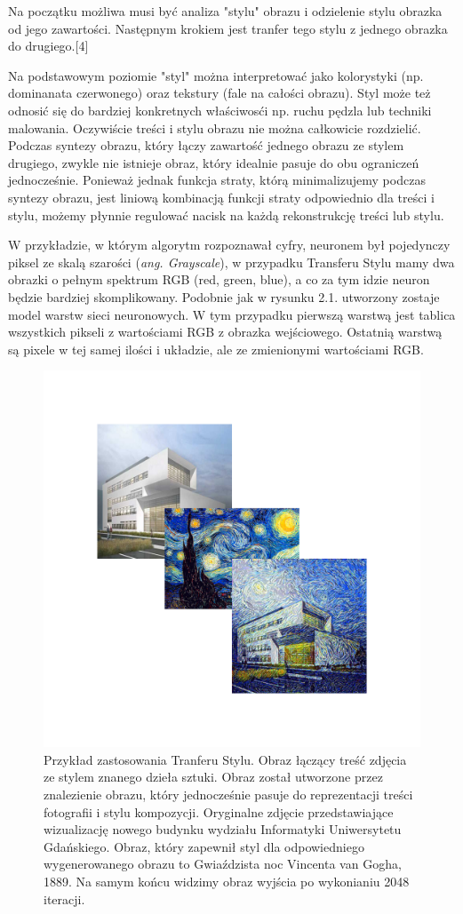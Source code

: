 \documentclass[brudnopis]{xmgr}
\begin{document}
Na początku możliwa musi być analiza "stylu" obrazu i odzielenie stylu obrazka od jego zawartości. 
Następnym krokiem jest tranfer tego stylu z jednego obrazka do drugiego.[4]

Na podstawowym poziomie "styl" można interpretować jako kolorystyki (np. dominanata czerwonego) oraz tekstury (fale na całości obrazu).
Styl może też odnosić się do bardziej konkretnych właściwosći np. ruchu pędzla lub techniki malowania. Oczywiście treści i stylu obrazu nie można całkowicie rozdzielić. Podczas syntezy obrazu, który łączy zawartość jednego obrazu ze stylem drugiego, zwykle nie istnieje obraz, który idealnie pasuje do obu ograniczeń jednocześnie. Ponieważ jednak funkcja straty, którą minimalizujemy podczas syntezy obrazu, jest liniową kombinacją funkcji straty odpowiednio dla treści i stylu, możemy płynnie regulować nacisk na każdą rekonstrukcję treści lub stylu.

W przykładzie, w którym algorytm rozpoznawał cyfry, neuronem był pojedynczy piksel ze skalą szarości (\textit{ang. Grayscale}), w przypadku Transferu Stylu mamy dwa obrazki o pełnym  spektrum RGB (red, green, blue), a co za tym idzie neuron będzie bardziej skomplikowany. Podobnie jak w rysunku 2.1. utworzony zostaje model warstw sieci neuronowych. W tym przypadku pierwszą warstwą jest tablica wszystkich pikseli z wartościami RGB z obrazka wejściowego. Ostatnią warstwą  są pixele w tej samej ilości i układzie, ale ze zmienionymi wartościami RGB. 

 \begin{figure}[!tbh]
\centering
\includegraphics[width=.8\hsize]{fig/6}
\caption{Przykład zastosowania Tranferu Stylu.
Obraz łączący treść zdjęcia ze stylem znanego dzieła sztuki. Obraz został utworzone przez znalezienie obrazu, który jednocześnie pasuje do reprezentacji treści fotografii i stylu kompozycji. Oryginalne zdjęcie przedstawiające wizualizację nowego budynku wydziału Informatyki Uniwersytetu Gdańskiego. Obraz, który zapewnił styl dla odpowiedniego wygenerowanego obrazu to  Gwiaździsta noc Vincenta van Gogha, 1889. Na samym końcu widzimy obraz wyjścia po wykonianiu 2048 iteracji.
\label{RYS.6}}
\end{figure}
\end{document}
